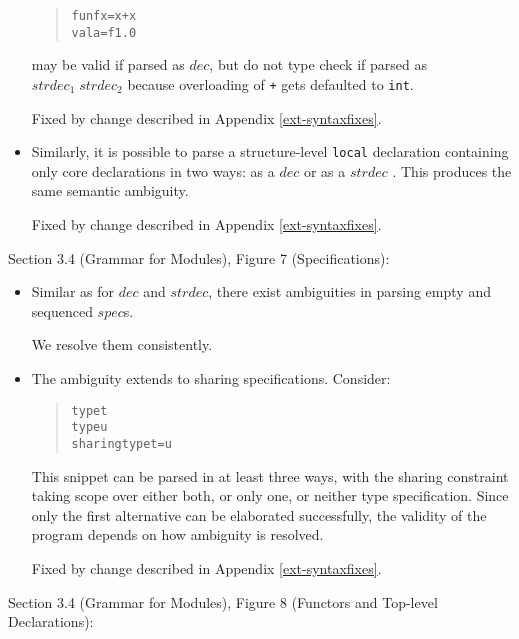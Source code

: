 \documentclass[twoside,titlepage]{article}
\begin{document}
\begin{appendix}
\begin{itemize}
\begin{quote}
\begin{alltt}
fun f x = x + x
val a = f 1.0
\end{alltt}
\end{quote}

may be valid if parsed as $\mathit{dec}$, but do not type check if parsed as $\mathit{strdec}_1\;\mathit{strdec}_2$ because overloading of {\tt +} gets defaulted to {\tt int}.

Fixed by change described in Appendix \ref{ext-syntaxfixes}.

\item Similarly, it is possible to parse a structure-level {\tt local} declaration containing only core declarations in two ways: as a $\mathit{dec}$ or as a $\mathit{strdec}$ \cite{mistakes}. This produces the same semantic ambiguity.

Fixed by change described in Appendix \ref{ext-syntaxfixes}.

\end{itemize}


Section 3.4 (Grammar for Modules), Figure 7 (Specifications):

\begin{itemize}

\item Similar as for $\mathit{dec}$ and $\mathit{strdec}$, there exist ambiguities in parsing empty and sequenced $\mathit{spec}$s.

We resolve them consistently.

\item The ambiguity extends to sharing specifications. Consider:

\begin{quote}
\begin{alltt}
type t
type u
sharing type t = u
\end{alltt}
\end{quote}

This snippet can be parsed in at least three ways, with the sharing constraint taking scope over either both, or only one, or neither type specification. Since only the first alternative can be elaborated successfully, the validity of the program depends on how ambiguity is resolved.

Fixed by change described in Appendix \ref{ext-syntaxfixes}.

\end{itemize}


Section 3.4 (Grammar for Modules), Figure 8 (Functors and Top-level Declarations):


\end{appendix}
\end{document}
